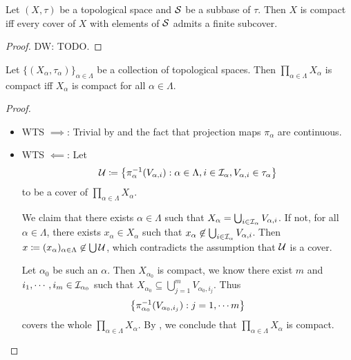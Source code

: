 \documentclass{techreport}
\newcommand{\diw}[1]{{\color{Red} DW: #1}}
\begin{document}
\begin{lemma}\label{Lem:CompactIffCompactWRTSubbase}
	Let $(X,\tau)$ be a topological space and $\mathcal{S}$ be a subbase of $\tau$.
	Then $X$ is compact iff every cover of $X$ with elements of $\mathcal{S}$ admits a finite subcover.
\end{lemma}
\begin{proof}
	\diw{TODO.}
\end{proof}

\begin{theorem}\label{The:Tikhonov}
	Let $\{(X_\alpha,\tau_\alpha)\}_{\alpha \in \Lambda}$ be a collection of topological spaces.
	Then $\prod_{\alpha \in \Lambda} X_\alpha$ is compact iff $X_\alpha$ is compact for all $\alpha \in \Lambda$.
\end{theorem}
\begin{proof}
	\begin{itemize}
		\item WTS $\implies$: Trivial by  and the fact that projection maps $\pi_\alpha$ are continuous.
		\item WTS $\impliedby$: Let
		\[
		\mathcal{U} \coloneqq \left\{ { \pi_\alpha^{-1}(V_{\alpha,i}) : \alpha \in \Lambda, i \in \mathcal{I}_\alpha, V_{\alpha,i} \in \tau_\alpha  } \right\}
		\]
		to be a cover of $\prod_{\alpha \in \Lambda} X_\alpha$.
		
		We claim that there exists $\alpha \in \Lambda$ such that $X_\alpha = \bigcup_{i \in \mathcal{I}_\alpha} V_{\alpha,i}$.
		If not, for all $\alpha \in \Lambda$, there exists $x_\alpha \in X_\alpha$ such that $x_\alpha \not\in \bigcup_{i \in \mathcal{I}_\alpha} V_{\alpha,i}$.
		Then $x \coloneqq (x_\alpha)_{\alpha \in \Lambda} \not\in \bigcup \mathcal{U}$, which contradicts the assumption that $\mathcal{U}$ is a cover.
		
		Let $\alpha_0$ be such an $\alpha$.
		Then $X_{\alpha_0}$ is compact, we know there exist $m$ and $i_1,\cdots,i_m \in \mathcal{I}_{\alpha_0}$ such that $X_{\alpha_0} \subseteq \bigcup_{j=1}^m V_{\alpha_0,i_j}$.
		Thus
		\[
		\left\{ { \pi_{\alpha_0}^{-1}(V_{\alpha_0, i_j}) : j = 1,\cdots m } \right\}
		\]
		covers the whole $\prod_{\alpha \in \Lambda} X_\alpha$.
		By , we conclude that $\prod_{\alpha \in \Lambda} X_\alpha$ is compact.
	\end{itemize}
\end{proof}
\end{document}
